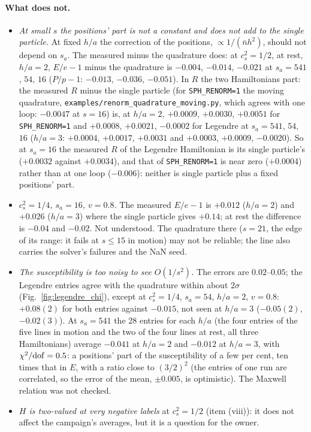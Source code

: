 \documentclass[11pt,aps,preprint,nofootinbib,superscriptaddress,tightenlines]{revtex4-2}
\def\Fig#1{Fig.~\ref{#1}}
\let\oldparagraph\paragraph
\renewcommand{\paragraph}{\par\bigskip\oldparagraph}
\begin{document}
\paragraph{What does not.}
\begin{itemize}
\item \emph{At small $s$ the positions' part is not a constant and does not add to the single particle.}  At fixed $h/a$ the correction of the positions,
  $\propto1/(\bar nh^2)$, should not depend on $s_a$.  The measured minus the quadrature does: at $c_s^2=1/2$, at rest, $h/a=2$, $E/e-1$ minus the quadrature
  is $-0.004$, $-0.014$, $-0.021$ at $s_a=541$, $54$, $16$ ($P/p-1$: $-0.013$, $-0.036$, $-0.051$).  In $R$ the two Hamiltonians part: the measured $R$ minus
  the single particle (for \texttt{SPH\_RENORM=1} the moving quadrature, \nolinkurl{examples/renorm_quadrature_moving.py}, which agrees with one loop:
  $-0.0047$ at $s=16$) is, at $h/a=2$, $+0.0009$, $+0.0030$, $+0.0051$ for \texttt{SPH\_RENORM=1} and $+0.0008$, $+0.0021$, $-0.0002$ for Legendre at
  $s_a=541$, $54$, $16$ ($h/a=3$: $+0.0004$, $+0.0017$, $+0.0031$ and $+0.0003$, $+0.0009$, $-0.0020$).  So at $s_a=16$ the measured $R$ of the Legendre
  Hamiltonian is its single particle's ($+0.0032$ against $+0.0034$), and that of \texttt{SPH\_RENORM=1} is near zero ($+0.0004$) rather than at one loop
  ($-0.006$): neither is single particle plus a fixed positions' part.
\item \emph{$c_s^2=1/4$, $s_a=16$, $v=0.8$.}  The measured $E/e-1$ is $+0.012$ ($h/a=2$) and $+0.026$ ($h/a=3$) where the single particle gives $+0.14$;
  at rest the difference is $-0.04$ and $-0.02$.  Not understood.  The quadrature there ($s=21$, the edge of its range: it fails at $s\le15$ in motion) may
  not be reliable; the line also carries the solver's failures and the NaN seed.
\item \emph{The susceptibility is too noisy to see $O(1/s^2)$.}  The errors are $0.02$--$0.05$; the Legendre entries agree with the quadrature within about
  $2\sigma$ (\Fig{fig:legendre_chi}), except at $c_s^2=1/4$, $s_a=54$, $h/a=2$, $v=0.8$: $+0.08(2)$ for both entries against $-0.015$, not seen at $h/a=3$
  ($-0.05(2)$, $-0.02(3)$).  At $s_a=541$ the 28 entries for each $h/a$ (the four entries of the five lines in motion and the two of the four lines at rest, all
  three Hamiltonians) average $-0.041$ at $h/a=2$ and $-0.012$ at $h/a=3$, with $\chi^2/{\rm dof}=0.5$: a positions' part of the
  susceptibility of a few per cent, ten times that in $E$, with a ratio close to $(3/2)^2$ (the entries of one run are correlated, so the error of the mean,
  $\pm0.005$, is optimistic).  The Maxwell relation was not checked.
\item \emph{$H$ is two-valued at very negative labels} at $c_s^2=1/2$ (item (viii)): it does not affect the campaign's averages, but it is a question for the owner.
\end{itemize}
\end{document}
